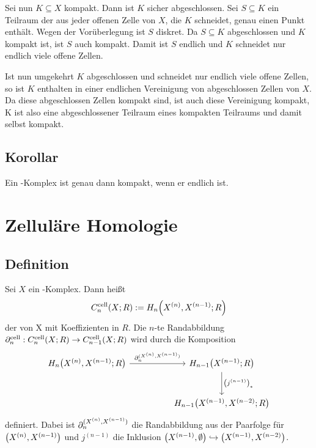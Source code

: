 Sei nun $K \subseteq X$ kompakt. Dann ist $K$ sicher abgeschlossen. Sei $S \subseteq K$ ein Teilraum der aus jeder offenen Zelle von $X$, die $K$ schneidet, genau einen 
Punkt enthält. Wegen der Vorüberlegung ist $S$ diskret. Da $S \subseteq K$ abgeschlossen und $K$ kompakt ist, ist $S$ auch kompakt. Damit ist $S$ endlich und $K$
schneidet nur endlich viele offene Zellen.

Ist nun umgekehrt $K$ abgeschlossen und schneidet nur endlich viele offene Zellen, so ist $K$ enthalten in einer endlichen Vereinigung von abgeschlossen Zellen von $X$.
Da diese abgeschlossen Zellen kompakt sind, ist auch diese Vereinigung kompakt, K ist also eine abgeschlossener Teilraum eines kompakten Teilraums und damit selbst kompakt.
\bewende

\subsection[Korollar: Ein \CW-Komplex ist genau dann kompakt, wenn er endlich ist.]{Korollar} %
\label{sub:116}
Ein \CW-Komplex ist genau dann kompakt, wenn er endlich ist.
\newpage

\section{Zelluläre Homologie} %
\label{sec:12}

\subsection[Definition: $n$-ter zellulärer Kettenmodul und zelluläre Randabbildung]{Definition} %
\label{sub:121}
Sei $X$ ein \CW-Komplex. Dann heißt 
\[
	C_n^{\cell}(X;R) := H_n \enbrace*{X^{(n)}, X^{(n-1)};R} 
\]
der  von X mit Koeffizienten in $R$. Die $n$-te Randabbildung
$\partial^{\cell}_n : C_n^{\cell}(X;R) \to C_{n-1}^{\cell}(X;R)$ wird durch die Komposition 
\[
	\begin{tikzcd}[column sep=huge, row sep=large]
		H_n \enbrace*{X^{(n)}, X^{(n-1)};R} \rar["\partial_n^{\enbrace{X^{(n)}, X^{(n-1)}}}"] & H_{n-1} \enbrace*{X^{(n-1)};R} \dar["\enbrace*{j^{(n-1)}}_*"] \\
		& H_{n-1} \enbrace*{X^{(n-1)}, X^{(n-2)};R} 
	\end{tikzcd}
\]
definiert. Dabei ist $\partial_n^{\enbrace{X^{(n)}, X^{(n-1)}}}$ die Randabbildung aus der Paarfolge für $\enbrace*{X^{(n)},X^{(n-1)}}$ und $j^{(n-1)}$ die Inklusion
$\enbrace*{X^{(n-1)},\emptyset} \hookrightarrow \enbrace*{X^{(n-1)}, X^{(n-2)}}$.

